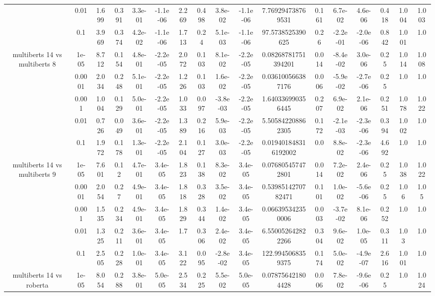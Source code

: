 \begin{tabular}{|c|c|c|c|c|c|c|c|c|c|c|c|c|c|c|c|c|}
 & 0.01 & 1.699 & 0.391 & 3.3e-01 & -1.1e-06 & 2.269 & 0.498 & 3.8e-02 & -1.1e-06 & 7.769294738769531 & 0.161 & 6.7e-02 & 4.6e-06 & 0.418 & 1.004 & 1.003 \\
 & 0.1 & 3.969 & 0.374 & 4.2e-02 & -1.1e-06 & 1.713 & 0.24 & 5.1e-03 & -1.1e-06 & 97.5738525390625 & 0.26 & -2.2e-01 & -2.0e-06 & 0.842 & 1.001 & 1.0 \\
\hline
\multirow{5}{*}{multiberts 14 vs multiberts 8} & 1e-05 & 8.712 & 0.154 & 4.8e-01 & -2.2e-05 & 2.072 & 0.103 & 8.1e-02 & -2.2e-05 & 0.08268781751394201 & 0.014 & -8.4e-02 & 3.0e-06 & 0.25 & 1.014 & 1.008 \\
 & 0.0001 & 2.034 & 0.248 & 5.1e-01 & -2.2e-05 & 1.226 & 0.103 & 1.6e-02 & -2.2e-05 & 0.036100566387176 & 0.006 & -5.9e-02 & -2.7e-06 & 0.25 & 1.0 & 1.0 \\
 & 0.001 & 1.004 & 0.129 & 5.0e-01 & -2.2e-05 & 1.033 & 0.097 & -3.8e-03 & -2.2e-05 & 1.640336990356445 & 0.207 & 6.9e-02 & 2.1e-06 & 0.251 & 1.078 & 1.022 \\
 & 0.01 & 0.726 & 0.049 & 3.6e-01 & -2.2e-05 & 1.389 & 0.216 & 5.9e-03 & -2.2e-05 & 5.505842208862305 & 0.172 & -2.1e-03 & -2.3e-06 & 0.394 & 1.002 & 1.0 \\
 & 0.1 & 1.972 & 0.178 & 1.3e-01 & -2.2e-05 & 2.104 & 0.127 & 3.0e-03 & -2.2e-05 & 0.019401848316192002 & 0.0 & 8.8e-02 & -2.3e-06 & 4.692 & 1.0 & 1.0 \\
\hline
\multirow{5}{*}{multiberts 14 vs multiberts 9} & 1e-05 & 7.601 & 0.12 & 4.7e-01 & 3.4e-05 & 1.823 & 0.138 & 8.3e-02 & 3.4e-05 & 0.076805457472801 & 0.014 & 7.2e-02 & 2.4e-06 & 0.25 & 1.038 & 1.022 \\
 & 0.0001 & 2.054 & 0.27 & 4.9e-01 & 3.4e-05 & 1.818 & 0.328 & 3.5e-02 & 3.4e-05 & 0.5398514270782471 & 0.101 & 1.0e-02 & -5.6e-06 & 0.25 & 1.06 & 1.05 \\
 & 0.001 & 1.535 & 0.234 & 4.9e-01 & 3.4e-05 & 1.829 & 0.344 & 1.4e-02 & 3.4e-05 & 0.066395342350006 & 0.003 & -3.7e-02 & 8.1e-06 & 0.252 & 1.0 & 1.0 \\
 & 0.01 & 1.325 & 0.211 & 3.6e-01 & 3.4e-05 & 1.7 & 0.306 & 2.4e-02 & 3.4e-05 & 6.550052642822266 & 0.304 & 9.6e-02 & 1.0e-05 & 0.311 & 1.03 & 1.0 \\
 & 0.1 & 2.505 & 0.228 & 1.0e-01 & 3.4e-05 & 3.122 & 0.095 & -2.8e-02 & 3.4e-05 & 122.9945068359375 & 0.174 & 5.0e-02 & -4.9e-07 & 2.616 & 1.001 & 1.0 \\
\hline
\multirow{5}{*}{multiberts 14 vs roberta } & 1e-05 & 8.054 & 0.288 & 3.8e-01 & 5.0e-05 & 2.534 & 0.225 & 5.5e-02 & 5.0e-05 & 0.078756421804428 & 0.006 & 7.8e-02 & -9.6e-06 & 0.25 & 1.0 & 1.024 \\

\end{tabular}
